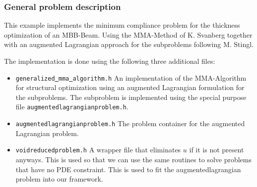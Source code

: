 \subsubsection{General problem description}
This example implements the minimum compliance problem for the thickness optimization 
of an MBB-Beam. Using the MMA-Method of K. Svanberg together with an augmented Lagrangian 
approach for the subproblems following M. Stingl.

The implementation is done using the following three additional files:

\begin{itemize}
\item \texttt{generalized\underline{ }mma\underline{ }algorithm.h}
  An implementation of the MMA-Algorithm for structural optimization using an augmented
  Lagrangian formulation for the subproblems. The subproblem is implemented using the 
  special purpose file \texttt{augmentedlagrangianproblem.h}.
\item \texttt{augmentedlagrangianproblem.h} The problem container 
  for the augmented Lagrangian problem.
\item \texttt{voidreducedproblem.h} A wrapper file that eliminates $u$ 
  if it is not present anyways. This is used so that we can use the same routines to 
  solve problems that have no PDE constraint. This is used to fit the augmentedlagrangian 
  problem into our framework.
\end{itemize}

